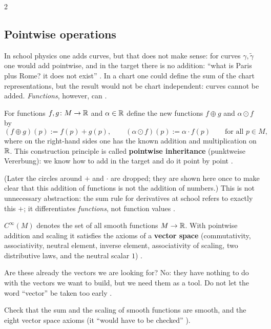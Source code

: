\begin{paracol}{2}
\subsection{Pointwise operations}\label{ssec:ts-pointwise}

In school physics one adds curves, but that does not make sense: for curves $\gamma,\tilde\gamma$ one would add
pointwise, and in the target there is no addition: ``what is Paris plus Rome? it does not exist'' .
In a chart one could define the sum of the chart representations, but the result would not be chart independent: curves
cannot be added. \emph{Functions}, however, can .

\begin{definition}\label{def:ts-pointwise}
For functions $f,g\colon M\to\mathbb{R}$ and $\alpha\in\mathbb{R}$ define the new functions $f\oplus g$ and $\alpha\odot f$ by
\[
  (f\oplus g)(p):=f(p)+g(p),\qquad (\alpha\odot f)(p):=\alpha\cdot f(p)\qquad\text{for all }p\in M,
\]
where on the right-hand sides one has the known addition and multiplication on $\mathbb{R}$. This construction principle is called
\textbf{pointwise inheritance} (punktweise Vererbung): we know how to add in the target and do it point by point
.
\end{definition}
(Later the circles around $+$ and $\cdot$ are dropped; they are shown here once to make clear that this addition of
functions is not the addition of numbers.) 
This is not unnecessary abstraction: the sum rule for derivatives at school refers to exactly this $+$; it differentiates
\emph{functions}, not function values .

\begin{definition}\label{def:ts-cinfty}
$C^\infty(M)$ denotes the set of all smooth functions $M\to\mathbb{R}$. With pointwise addition and scaling it satisfies the axioms
of a \textbf{vector space} (commutativity, associativity, neutral element, inverse element, associativity of scaling, two
distributive laws, and the neutral scalar $1$) .
\end{definition}
Are these already the vectors we are looking for? No: they have nothing to do with the vectors we want to build, but we need
them as a tool. Do not let the word ``vector'' be taken too early .
\begin{exercise}\label{ex:ts-cinfty-vs}
Check that the sum and the scaling of smooth functions are smooth, and the eight vector space axioms
(it ``would have to be checked'' ).
\end{exercise}


\end{paracol}
